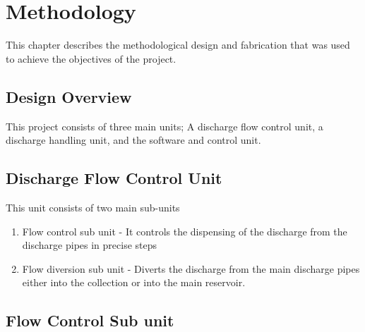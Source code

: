 \section{Methodology}
\par
This chapter describes the methodological design and fabrication that was used to achieve the objectives of the project.
\subsection{Design Overview}
\par
This project consists of three main units; A discharge flow control unit, a discharge handling unit, and the software and control unit.
\subsection{Discharge Flow Control Unit}
\par
This unit consists of two main sub-units
\begin{enumerate}
    \item Flow control sub unit - It controls the dispensing of the discharge from the discharge pipes in precise steps
    \item Flow diversion sub unit - Diverts the discharge from the main discharge pipes either into the collection or into the main reservoir. 
\end{enumerate}
\subsection{Flow Control Sub unit}
